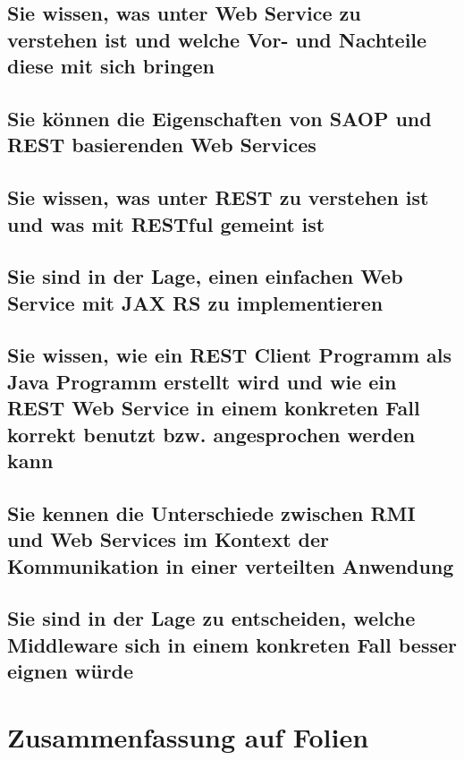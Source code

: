 \documentclass[a4paper]{article}
\begin{document}
		
		\subsection{Sie wissen, was unter Web Service zu verstehen ist und welche Vor- und Nachteile diese mit sich bringen}
		
		
		
		\subsection{Sie können die Eigenschaften von SAOP und REST basierenden Web Services}
		
		
		
		\subsection{Sie wissen, was unter REST zu verstehen ist und was mit RESTful gemeint ist}
		
		
		
		\subsection{Sie sind in der Lage, einen einfachen Web Service mit JAX RS zu implementieren}
		
		
		
		\subsection{Sie wissen, wie ein REST Client Programm als Java Programm erstellt wird und wie ein REST Web Service in einem konkreten Fall korrekt benutzt bzw. angesprochen werden kann}
		
		
		
		\subsection{Sie kennen die Unterschiede zwischen RMI und Web Services im Kontext der Kommunikation in einer verteilten Anwendung}
		
		
		
		\subsection{Sie sind in der Lage zu entscheiden, welche Middleware sich in einem konkreten Fall besser eignen würde}
		
		
		
		
	\newpage	
	\section{Zusammenfassung auf Folien}
	
		
		
		
	\newpage
		
	
		
		
\end{document}
